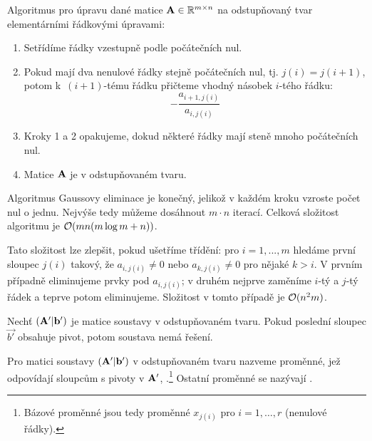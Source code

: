 \begin{algorithm}
    Algoritmus  pro úpravu dané matice 
    $\mathbf{A} \in \mathbb{R}^{m \times n}$ na odstupňovaný tvar 
    elementárními řádkovými úpravami:
    \begin{enumerate}
        \item Setřídíme řádky vzestupně podle počátečních nul.
        \item Pokud mají dva nenulové řádky stejně počátečních nul, tj. $j(i) =
            j(i+1)$, potom k~$(i+1)$-tému řádku přičteme vhodný násobek
            $i$-tého řádku:
            $$-\frac{a_{i+1,j(i)}}{a_{i,j(i)}}$$
        \item Kroky 1 a 2 opakujeme, dokud některé řádky mají steně mnoho
            počátečních nul. 
        \item Matice $\mathbf{A}$ je v odstupňovaném tvaru.
    \end{enumerate}
\end{algorithm}

\begin{remark}
    Algoritmus Gaussovy eliminace je konečný, jelikož v každém kroku vzroste počet nul o
    jednu. Nejvýše tedy můžeme dosáhnout $m \cdot n$ iterací. Celková složitost
    algoritmu je $\mathcal{O}(mn(m\log{m} + n))$. 
    
    Tato složitost lze zlepšit, 
    pokud ušetříme třídění: pro $i=1,...,m$ hledáme první sloupec $j(i)$ takový,
    že $a_{i,j(i)} \neq 0$ nebo $a_{k,j(i)} \neq 0$ pro nějaké $k > i$. V prvním
    případně eliminujeme prvky pod $a_{i,j(i)}$; v druhém nejprve zaměníme
    $i$-tý a $j$-tý řádek a teprve potom eliminujeme. Složitost v tomto případě
    je $\mathcal{O}(n^2m)$.
        \end{remark}

\begin{observation}
    \label{obs:pivotvb}
    Nechť $(\mathbf{A'}|\mathbf{b'})$ je matice soustavy v odstupňovaném tvaru.
    Pokud poslední sloupec $\vec{b'}$ obsahuje pivot, potom soustava nemá
    řešení.
\end{observation}

\begin{definition}
    Pro matici soustavy $(\mathbf{A'}|\mathbf{b'})$ v odstupňovaném tvaru nazveme
    proměnné, jež odpovídají sloupcům s pivoty v $\mathbf{A'}$, .\footnote{Bázové proměnné jsou tedy proměnné $x_{j(i)}$ pro
    $i=1,\dots,r$ (nenulové řádky).} Ostatní proměnné se nazývají
    .
\end{definition}

